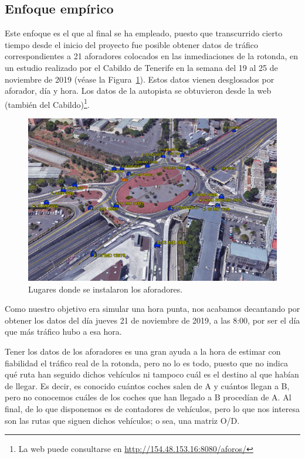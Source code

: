 \subsection{Enfoque empírico}

Este enfoque es el que al final se ha empleado, puesto que transcurrido cierto tiempo desde el inicio del proyecto fue posible obtener datos de tráfico correspondientes a 21 aforadores colocados en las inmediaciones de la rotonda, en un estudio realizado por el Cabildo de Tenerife en la semana del 19 al 25 de noviembre de 2019 (véase la Figura~\ref{fig:aforadores}). Estos datos vienen desglosados por aforador, día y hora. Los datos de la autopista se obtuvieron desde la web (también del Cabildo)\footnote{La web puede consultarse en \url{http://154.48.153.16:8080/aforos/}}.

\begin{figure}[ht]
    \centering
    \includegraphics[width=\textwidth]{report/images/aforadores.png}
    \caption{Lugares donde se instalaron los aforadores.}
    \label{fig:aforadores}
\end{figure}

Como nuestro objetivo era simular una hora punta, nos acabamos decantando por obtener los datos del día jueves 21 de noviembre de 2019, a las 8:00, por ser el día que más tráfico hubo a esa hora.

Tener los datos de los aforadores es una gran ayuda a la hora de estimar con fiabilidad el tráfico real de la rotonda, pero no lo es todo, puesto que no indica qué ruta han seguido dichos vehículos ni tampoco cuál es el destino al que habían de llegar. Es decir, es conocido cuántos coches salen de A y cuántos llegan a B, pero no conocemos cuáles de los coches que han llegado a B procedían de A. Al final, de lo que disponemos es de contadores de vehículos, pero lo que nos interesa son las rutas que siguen dichos vehículos; o sea, una matriz O/D.

